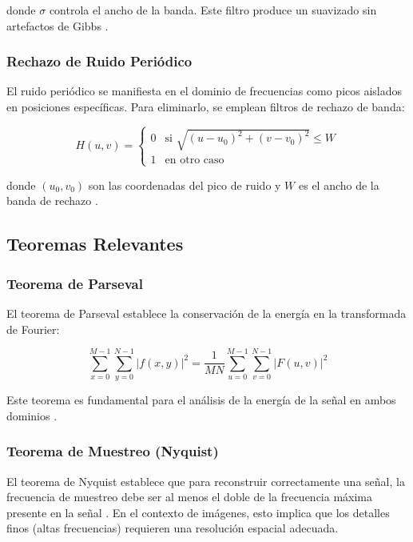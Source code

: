 \documentclass[conference]{IEEEtran}
\begin{document}
donde $\sigma$ controla el ancho de la banda. Este filtro produce un suavizado sin artefactos de Gibbs \cite{szeliski2010}.

\subsubsection{Rechazo de Ruido Periódico}

El ruido periódico se manifiesta en el dominio de frecuencias como picos aislados en posiciones específicas. Para eliminarlo, se emplean filtros de rechazo de banda:

\begin{equation}
H(u,v) = 
\begin{cases}
0 & \text{si } \sqrt{(u-u_0)^2 + (v-v_0)^2} \leq W \\
1 & \text{en otro caso}
\end{cases}
\label{eq:rechazo_banda}
\end{equation}

donde $(u_0, v_0)$ son las coordenadas del pico de ruido y $W$ es el ancho de la banda de rechazo \cite{gonzalez2018}.

\subsection{Teoremas Relevantes}

\subsubsection{Teorema de Parseval}

El teorema de Parseval establece la conservación de la energía en la transformada de Fourier:

\begin{equation}
\sum_{x=0}^{M-1} \sum_{y=0}^{N-1} |f(x,y)|^2 = \frac{1}{MN} \sum_{u=0}^{M-1} \sum_{v=0}^{N-1} |F(u,v)|^2
\label{eq:parseval}
\end{equation}

Este teorema es fundamental para el análisis de la energía de la señal en ambos dominios \cite{gockenbach2010}.

\subsubsection{Teorema de Muestreo (Nyquist)}

El teorema de Nyquist establece que para reconstruir correctamente una señal, la frecuencia de muestreo debe ser al menos el doble de la frecuencia máxima presente en la señal \cite{smith2003}. En el contexto de imágenes, esto implica que los detalles finos (altas frecuencias) requieren una resolución espacial adecuada.
\end{document}
